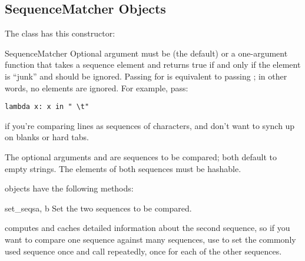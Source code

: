 \begin{seealso}
\end{seealso}


\subsection{SequenceMatcher Objects \label{sequence-matcher}}

The  class has this constructor:

\begin{classdesc}{SequenceMatcher}{}
  Optional argument  must be  (the default) or
  a one-argument function that takes a sequence element and returns
  true if and only if the element is ``junk'' and should be ignored.
  Passing  for  is equivalent to passing
  ; in other words, no elements are ignored.  For
  example, pass:

\begin{verbatim}
lambda x: x in " \t"
\end{verbatim}

  if you're comparing lines as sequences of characters, and don't want
  to synch up on blanks or hard tabs.

  The optional arguments  and  are sequences to be
  compared; both default to empty strings.  The elements of both
  sequences must be hashable.
\end{classdesc}


 objects have the following methods:

\begin{methoddesc}{set_seqs}{a, b}
  Set the two sequences to be compared.
\end{methoddesc}

 computes and caches detailed information about
the second sequence, so if you want to compare one sequence against
many sequences, use  to set the commonly used
sequence once and call  repeatedly, once for each
of the other sequences.

